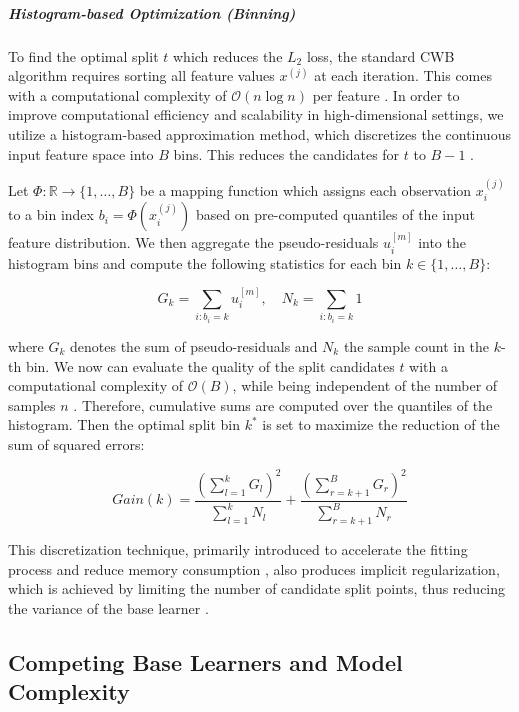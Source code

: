 \documentclass[fontsize=12 pt]{scrartcl}
\begin{document}
\subparagraph{Histogram-based Optimization (Binning)}

To find the optimal split $t$ which reduces the $L_2$ loss, the standard CWB algorithm requires sorting all feature values $x^{(j)}$ at each iteration. This comes with a computational complexity of $\mathcal{O}(n \log n)$ per feature \citep{schalk2022accelerated}. In order to improve computational efficiency and scalability in high-dimensional settings, we utilize a histogram-based approximation method, which discretizes the continuous input feature space into $B$ bins. This reduces the candidates for $t$ to $B-1$ \citep{ke2017lightgbm}.

Let $\Phi: \mathbb{R} \to \{1, \dots, B\}$ be a mapping function which assigns each observation $x_i^{(j)}$ to a bin index $b_i = \Phi(x_i^{(j)})$ based on pre-computed quantiles of the input feature distribution. We then aggregate the pseudo-residuals $u_i^{[m]}$ into the histogram bins and compute the following statistics for each bin $k \in \{1, \dots, B\}$:

\begin{equation}
    G_k = \sum_{i: b_i = k} u_i^{[m]}, \quad N_k = \sum_{i: b_i = k} 1
\end{equation}

where $G_k$ denotes the sum of pseudo-residuals and $N_k$ the sample count in the $k$-th bin. We now can evaluate the quality of the split candidates $t$ with a computational complexity of $\mathcal{O}(B)$, while being independent of the number of samples $n$ \citep{chen2016xgboost}. Therefore, cumulative sums are computed over the quantiles of the histogram. Then the optimal split bin $k^*$ is set to maximize the reduction of the sum of squared errors:

\begin{equation}
    Gain(k) = \frac{(\sum_{l=1}^k G_l)^2}{\sum_{l=1}^k N_l} + \frac{(\sum_{r=k+1}^B G_r)^2}{\sum_{r=k+1}^B N_r}
\end{equation}

This discretization technique, primarily introduced to accelerate the fitting process and reduce memory consumption \citep{schalk2023accelerated}, also produces implicit regularization, which is achieved by limiting the number of candidate split points, thus reducing the variance of the base learner \citep{ke2017lightgbm}.


\subsection{Competing Base Learners and Model Complexity}
\end{document}
